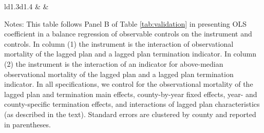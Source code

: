 \documentclass[12pt,english,hidelinks]{article}
\begin{document}
\begin{table}
  \caption{\label{tab:more_balance}Additional Balance Tests}
  \vspace{-0.5cm}
  \begin{center}
  \begin{tabular}{ld{1.3}d{1.4} }
  \toprule 
    &  &  \tabularnewline
  \midrule
  
  \end{tabular}
  \end{center}
  {\footnotesize{}Notes: This table follows Panel B of Table \ref{tab:validation} in presenting OLS coefficient in a balance regression of observable controls on the instrument and controls. In column (1) the instrument is the interaction of observational mortality of the lagged plan and a lagged plan termination indicator. In column (2) the instrument is the interaction of an indicator for above-median observational mortality of the lagged plan and a lagged plan termination indicator. In all specifications, we control for the observational mortality of the lagged plan and termination main effects, county-by-year fixed effects, year- and county-specific termination effects, and interactions of lagged plan characteristics (as described in the text). Standard errors are clustered by county and reported in parentheses.}\tabularnewline
  {\footnotesize\par}
\end{table}
\clearpage

\clearpage

\clearpage

\clearpage

\clearpage

\clearpage
\end{document}
